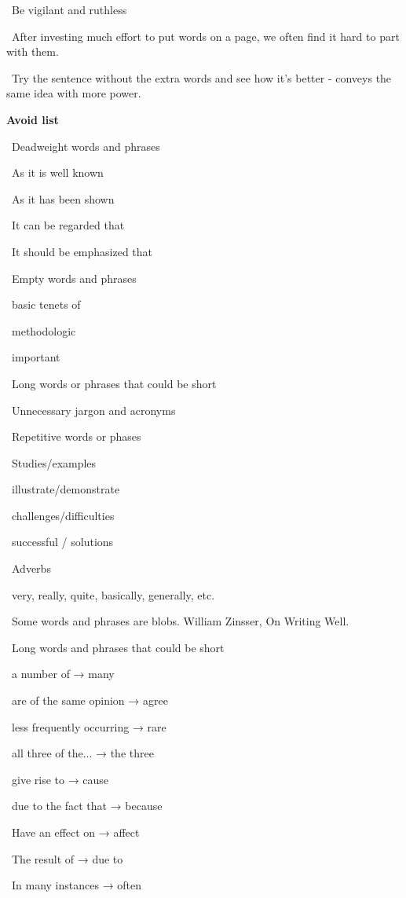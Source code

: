 \documentclass[a4paper,12pt]{article}
\begin{document}
\par\textbullet\ Be vigilant and ruthless

\par\textbullet\ After investing much effort to put words on a page, we often find it hard to part with them.

\par\textbullet\ Try the sentence without the extra words and see how it's better - conveys the same idea with more power.

\par\textbf{Avoid list}
\par\textbullet\ Deadweight words and phrases
\par\quad\textopenbullet\ As it is well known
\par\quad\textopenbullet\ As it has been shown
\par\quad\textopenbullet\ It can be regarded that
\par\quad\textopenbullet\ It should be emphasized that
\par\textbullet\ Empty words and phrases
\par\quad\textopenbullet\ basic tenets of
\par\quad\textopenbullet\ methodologic
\par\quad\textopenbullet\ important
\par\textbullet\ Long words or phrases that could be short
\par\textbullet\ Unnecessary jargon and acronyms
\par\textbullet\ Repetitive words or phases
\par\quad\textopenbullet\ Studies/examples
\par\quad\textopenbullet\ illustrate/demonstrate
\par\quad\textopenbullet\ challenges/difficulties
\par\quad\textopenbullet\ successful / solutions
\par\textbullet\ Adverbs
\par\quad\textopenbullet\ very, really, quite, basically, generally, etc.

\par\textbullet\ Some words and phrases are blobs. William Zinsser, On Writing Well.

\par\textbullet\ Long words and phrases that could be short
\par\quad\textopenbullet\ a number of               → many
\par\quad\textopenbullet\ are of the same opinion   → agree
\par\quad\textopenbullet\ less frequently occurring → rare
\par\quad\textopenbullet\ all three of the...       → the three
\par\quad\textopenbullet\ give rise to              → cause
\par\quad\textopenbullet\ due to the fact that      → because
\par\quad\textopenbullet\ Have an effect on         → affect
\par\quad\textopenbullet\ The result of             → due to
\par\quad\textopenbullet\ In many instances         → often
\end{document}
